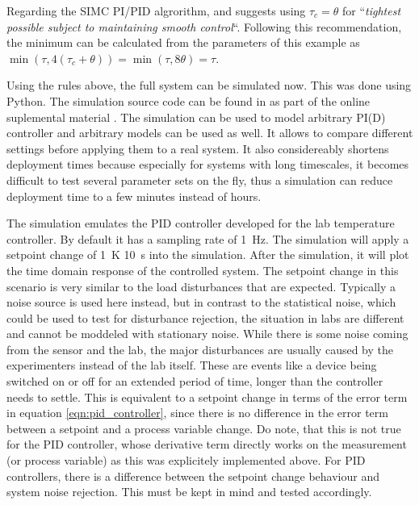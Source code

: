 Regarding the SIMC PI/PID algrorithm, \citeauthor{simc_paper} \cite{simc_paper} and \citep[ch. 5]{simc} suggests using $\tau_c = \theta$ for “\textit{tightest possible subject to maintaining smooth control}“. Following this recommendation, the minimum can be calculated from the parameters of this example as $\min\left(\tau, 4 (\tau_c+\theta)\right) = \min\left(\tau, 8 \theta\right) = \tau$.

Using the rules above, the full system can be simulated now. This was done using Python. The simulation source code can be found in  as part of the online suplemental material \cite{supplemental_material}. The simulation can be used to model arbitrary PI(D) controller and arbitrary models can be used as well. It allows to compare different settings before applying them to a real system. It also considereably shortens deployment times because especially for systems with long timescales, it becomes difficult to test several parameter sets on the fly, thus a simulation can reduce deployment time to a few minutes instead of hours.

The simulation emulates the PID controller developed for the lab temperature controller. By default it has a sampling rate of \qty{1}{\Hz}. The simulation  will apply a setpoint change of \qty{+1}{\K} \qty{10}{\s} into the simulation. After the simulation, it will plot the time domain response of the controlled system. The setpoint change in this scenario is very similar to the load disturbances that are expected. Typically a noise source is used here instead, but in contrast to the statistical noise, which could be used to test for disturbance rejection, the situation in labs are different and cannot be moddeled with stationary noise. While there is some noise coming from the sensor and the lab, the major disturbances are usually caused by the experimenters instead of the lab itself. These are events like a device being switched on or off for an extended period of time, longer than the controller needs to settle. This is equivalent to a setpoint change in terms of the error term in equation \ref{eqn:pid_controller}, since there is no difference in the error term between a setpoint and a process variable change. Do note, that this is not true for the PID controller, whose derivative term directly works on the measurement (or process variable) as this was explicitely implemented above. For PID controllers, there is a difference between the setpoint change behaviour and system noise rejection. This must be kept in mind and tested accordingly.

